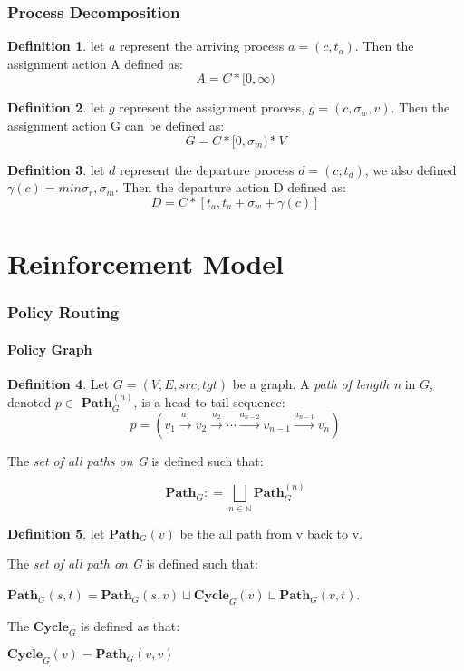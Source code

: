 \documentclass{article}
\theoremstyle{definition}
\newtheorem{definition}{Definition}[section]
\theoremstyle{remark}
\newcommand{\path}[2]{\mathbf{Path}^{#2}_{#1}}
\newcommand{\pathall}[1]{\mathbf{Path}_{#1}}
\newcommand{\cyclepath}[1]{\mathbf{Cycle}_{#1}}
\newcommand{\labeledarrow}[1]{\stackrel{#1}{\rightarrow}}
\begin{document}
	\section{Process Decomposition}
	
		\begin{definition}
			let $a$ represent the arriving process $a = (c, t_a)$. Then the assignment action A defined as:
			\[
			A = C * [0, \infty)
			\]
		\end{definition}
		
		\begin{definition}
			let $g$ represent the assignment process, $g = (c,\sigma_w, v)$. Then the assignment action G can be defined as:
			\[
			G = C*[0,\sigma_m)*V
			\]
		\end{definition}
		
		\begin{definition}
			let $d$ represent the departure process $d = (c, t_d)$, we also defined $\gamma(c) = min{\sigma_r,\sigma_m}.$ Then the departure action D defined as:
			\[
			D = C * [t_a, t_a + \sigma_w + \gamma(c)]
			\]
		\end{definition}
	
	\newpage
	
	\part{Reinforcement Model}
	
	\section{Policy Routing}
	
	\subsection{Policy Graph}
	
		\begin{definition} 
			Let $G = (V, E, src, tgt)$ be a graph. A \emph{path of length n} in $G$, denoted $p \in$ $\path{G}{(n)}$, is a head-to-tail sequence:
			\[
			p = (v_{1}   \labeledarrow{a_{1}}   v_{2}   \labeledarrow{a_{2}}  \cdots   \labeledarrow{a_{n-2}}  v_{n-1}   \labeledarrow{a_{n-1}}   v_{n})
			\]
			
			The \emph{set of all paths on G} is defined such that: 
			
			\[
			\pathall{G} : = \bigsqcup_{n \in \mathbb{N}}{\path{G}{(n)}}
			\]
		\end{definition}
		
		\begin{definition}
			let $\pathall{G}(v)$ be the all path from v back to v.
			
			The \emph{set of all path on G} is defined such that:
			
			$\pathall{G}(s,t) = \pathall{G}(s,v)\sqcup \cyclepath{G}(v) \sqcup \pathall{G}(v,t)$.
			
			The $\cyclepath{G}$ is defined as that:
			
			$\cyclepath{G}(v) = \pathall{G}(v,v)$
		\end{definition}
	
	\newpage    
	
\end{document}
